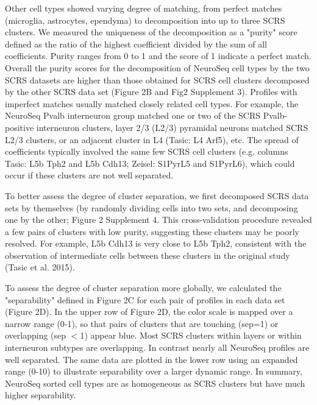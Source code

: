 Other cell types showed varying degree of matching, from perfect matches (microglia, astrocytes, ependyma) to decomposition into up to three SCRS clusters. We measured the uniqueness of the decomposition as a "purity" score defined as the ratio of the highest coefficient divided by the sum of all coefficients. Purity ranges from 0 to 1 and the score of 1 indicate a perfect match. Overall the purity scores for the decomposition of NeuroSeq cell types by the two SCRS datasets are higher than those obtained for SCRS cell clusters decomposed by the other SCRS data set (Figure 2B and Fig2 Supplement 3). Profiles with imperfect matches usually matched closely related cell types. For example, the NeuroSeq Pvalb interneuron group matched one or two of the SCRS Pvalb-positive interneuron clusters, layer 2/3 (L2/3) pyramidal neurons matched SCRS L2/3 clusters, or an adjacent cluster in L4 (Tasic: L4 Arf5), etc. The spread of coefficients typically involved the same few SCRS cell clusters (e.g. columns Tasic: L5b Tph2 and L5b Cdh13; Zeisel: S1PyrL5 and S1PyrL6), which could occur if these clusters are not well separated. 

To better assess the degree of cluster separation, we first decomposed SCRS data sets by themselves (by randomly dividing cells into two sets, and decomposing one by the other; Figure 2 Supplement 4. This cross-validation procedure revealed a few pairs of clusters with low purity, suggesting these clusters may be poorly resolved. For example, L5b Cdh13 is very close to L5b Tph2, consistent with the observation of intermediate cells between these clusters in the original study (Tasic et al. 2015).  

To assess the degree of cluster separation more globally, we calculated the "separability" defined in Figure 2C for each pair of profiles in each data set (Figure 2D). In the upper row of Figure 2D, the color scale is mapped over a narrow range (0-1), so that pairs of clusters that are touching (sep=1) or overlapping (sep $<$1) appear blue. Most SCRS clusters within layers or within interneuron subtypes are overlapping. In contrast nearly all NeuroSeq profiles are well separated. The same data are plotted in the lower row using an expanded range (0-10) to illustrate separability over a larger dynamic range. In summary, NeuroSeq sorted cell types are as homogeneous as SCRS clusters but have much higher separability. 










